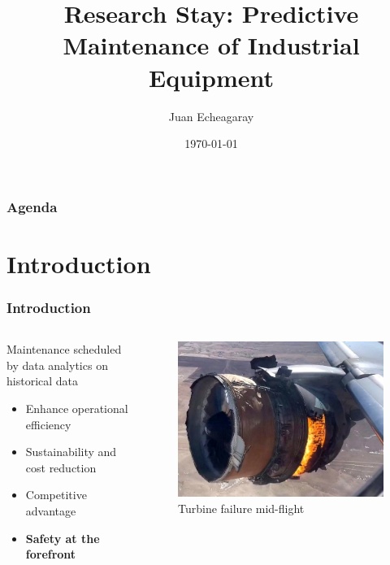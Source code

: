 \documentclass{beamer}
\title{Research Stay: Predictive Maintenance of Industrial Equipment}
\author{Juan Echeagaray}
\institute{Tec de Monterrey}
\date{\today}
\begin{document}
    \frame{\titlepage}

    \begin{frame}
        \frametitle{Agenda}
        \tableofcontents
    \end{frame}

    \section{Introduction}

        \begin{frame}
            \frametitle{Introduction}
            \begin{columns}
                \begin{column}{0.5\textwidth}
                    Maintenance scheduled by data analytics on historical data
                    \begin{itemize}
                        \item Enhance operational efficiency
                        \item Sustainability and cost reduction
                        \item Competitive advantage
                        \item \textbf{Safety at the forefront}
                    \end{itemize}
                \end{column}
                \begin{column}{0.5\textwidth}
                    \begin{figure}[!htbp]
                        \centering
                        \includegraphics[scale=0.3]{turbine_failure.jpg}
                        \caption{Turbine failure mid-flight \cite{bbc-news-2021}}
                    \end{figure}
                \end{column}
            \end{columns}
        \end{frame}
\end{document}
